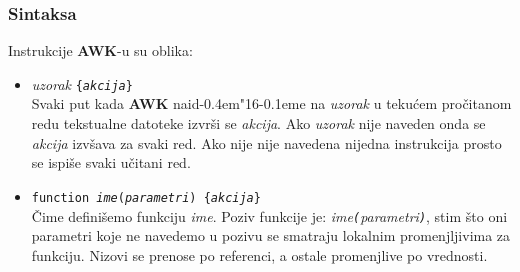 \documentclass[12pt,a4paper]{article}
\def\d{d\kern-0.4em\char"16\kern-0.1em}
\begin{document}
      \subsubsection{Sintaksa}
        Instrukcije {\bf AWK}-u su oblika:
        \begin{itemize}
        \item
          {\it uzorak} {\tt\{{\it akcija}\}}\\
          Svaki put kada {\bf AWK} nai\d e na {\it uzorak} u teku\'cem
          pro\v citanom redu tekstualne datoteke izvr\v si se {\it akcija}.
          Ako {\it uzorak} nije naveden onda se {\it akcija} izv\v sava za
          svaki red.
          Ako nije nije navedena nijedna instrukcija prosto se ispi\v se svaki
          u\v citani red.
        \item
          {\tt function {\it ime}({\it parametri}) \{{\it akcija}\}}\\
          \v Cime defini\v semo funkciju {\it ime}.
          Poziv funkcije je: {\it ime{\tt(}parametri{\tt)}}, stim \v sto oni
          parametri koje ne navedemo u pozivu se smatraju lokalnim
          promenjljivima za funkciju.
          Nizovi se prenose po referenci, a ostale promenjlive po vrednosti.
        \end{itemize}
\end{document}
